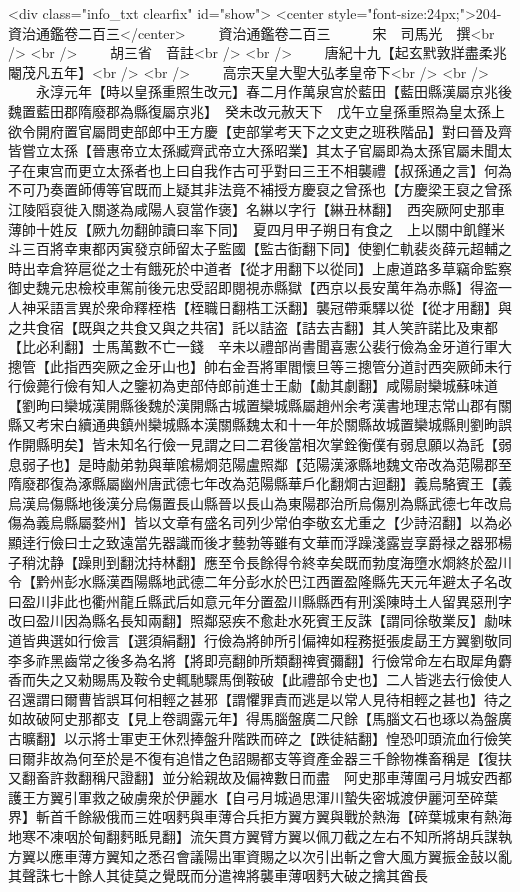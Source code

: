<div class="info_txt clearfix" id="show">
<center style="font-size:24px;">204-資治通鑑卷二百三</center>
  　　資治通鑑卷二百三　　　宋　司馬光　撰<br />
<br />
　　胡三省　音註<br />
<br />
　　唐紀十九【起玄黓敦牂盡柔兆閹茂凡五年】<br />
<br />
　　高宗天皇大聖大弘孝皇帝下<br />
<br />
　　永淳元年【時以皇孫重照生改元】春二月作萬泉宫於藍田【藍田縣漢屬京兆後魏置藍田郡隋廢郡為縣復屬京兆】　癸未改元赦天下　戊午立皇孫重照為皇太孫上欲令開府置官屬問吏部郎中王方慶【吏部掌考天下之文吏之班秩階品】對曰晉及齊皆嘗立太孫【晉惠帝立太孫臧齊武帝立大孫昭業】其太子官屬即為太孫官屬未聞太子在東宫而更立太孫者也上曰自我作古可乎對曰三王不相襲禮【叔孫通之言】何為不可乃奏置師傅等官既而上疑其非法竟不補授方慶裒之曾孫也【方慶梁王裒之曾孫江陵䧟裒徙入關遂為咸陽人裒當作褒】名綝以字行【綝丑林翻】　西突厥阿史那車薄帥十姓反【厥九勿翻帥讀曰率下同】　夏四月甲子朔日有食之　上以關中飢饉米斗三百將幸東都丙寅發京師留太子監國【監古衘翻下同】使劉仁軌裴炎薛元超輔之時出幸倉猝扈從之士有餓死於中道者【從才用翻下以從同】上慮道路多草竊命監察御史魏元忠檢校車駕前後元忠受詔即閱視赤縣獄【西京以長安萬年為赤縣】得盗一人神采語言異於衆命釋桎梏【桎職日翻梏工沃翻】襲冠帶乘驛以從【從才用翻】與之共食宿【既與之共食又與之共宿】託以詰盗【詰去吉翻】其人笑許諾比及東都【比必利翻】士馬萬數不亡一錢　辛未以禮部尚書聞喜憲公裴行儉為金牙道行軍大摠管【此指西突厥之金牙山也】帥右金吾將軍閻懷旦等三摠管分道討西突厥師未行行儉薨行儉有知人之鑒初為吏部侍郎前進士王勮【勮其劇翻】咸陽尉欒城蘇味道【劉昫曰欒城漢開縣後魏於漢開縣古城置欒城縣屬趙州余考漢書地理志常山郡有關縣又考宋白續通典鎮州欒城縣本漢關縣魏太和十一年於關縣故城置欒城縣則劉昫誤作開縣明矣】皆未知名行儉一見謂之曰二君後當相次掌銓衡僕有弱息願以為託【弱息弱子也】是時勮弟勃與華隂楊烱范陽盧照鄰【范陽漢涿縣地魏文帝改為范陽郡至隋廢郡復為涿縣屬幽州唐武德七年改為范陽縣華戶化翻烱古迴翻】義烏駱賓王【義烏漢烏傷縣地後漢分烏傷置長山縣晉以長山為東陽郡治所烏傷別為縣武德七年改烏傷為義烏縣屬婺州】皆以文章有盛名司列少常伯李敬玄尤重之【少詩沼翻】以為必顯逹行儉曰士之致遠當先器識而後才藝勃等雖有文華而浮躁淺露豈享爵禄之器邪楊子稍沈静【躁則到翻沈持林翻】應至令長餘得令終幸矣既而勃度海墮水烱終於盈川令【黔州彭水縣漢酉陽縣地武德二年分彭水於巴江西置盈隆縣先天元年避太子名改曰盈川非此也衢州龍丘縣武后如意元年分置盈川縣縣西有刑溪陳時土人留異惡刑字改曰盈川因為縣名長知兩翻】照鄰惡疾不愈赴水死賓王反誅【謂同徐敬業反】勮味道皆典選如行儉言【選須絹翻】行儉為將帥所引偏禆如程務挺張䖍勗王方翼劉敬同李多祚黑齒常之後多為名將【將即亮翻帥所類翻禆賓彌翻】行儉常命左右取犀角麝香而失之又勑賜馬及鞍令史輒馳驟馬倒鞍破【此禮部令史也】二人皆逃去行儉使人召還謂曰爾曹皆誤耳何相輕之甚邪【謂懼罪責而逃是以常人見待相輕之甚也】待之如故破阿史那都支【見上卷調露元年】得馬腦盤廣二尺餘【馬腦文石也琢以為盤廣古曠翻】以示將士軍吏王休烈捧盤升階跌而碎之【跌徒結翻】惶恐叩頭流血行儉笑曰爾非故為何至於是不復有追惜之色詔賜都支等資產金器三千餘物襍畜稱是【復扶又翻畜許救翻稱尺證翻】並分給親故及偏禆數日而盡　阿史那車薄圍弓月城安西都護王方翼引軍救之破虜衆於伊麗水【自弓月城過思渾川蟄失密城渡伊麗河至碎葉界】斬首千餘級俄而三姓咽麫與車薄合兵拒方翼方翼與戰於熱海【碎葉城東有熱海地寒不凍咽於甸翻麫眡見翻】流矢貫方翼臂方翼以佩刀截之左右不知所將胡兵謀執方翼以應車薄方翼知之悉召會議陽出軍資賜之以次引出斬之會大風方翼振金鼔以亂其聲誅七十餘人其徒莫之覺既而分遣禆將襲車薄咽麫大破之擒其酋長